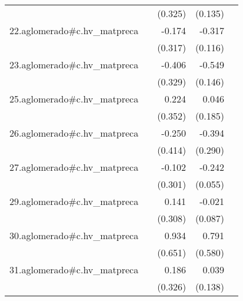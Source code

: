 {\begin{longtable}{l*{4}{D{.}{.}{-1}}}
            &                     &     (0.325)         &     (0.135)         &                     \\
\addlinespace
22.aglomerado#c.hv\_matpreca&                     &      -0.174         &      -0.317\sym{**} &                     \\
            &                     &     (0.317)         &     (0.116)         &                     \\
\addlinespace
23.aglomerado#c.hv\_matpreca&                     &      -0.406         &      -0.549\sym{***}&                     \\
            &                     &     (0.329)         &     (0.146)         &                     \\
\addlinespace
25.aglomerado#c.hv\_matpreca&                     &       0.224         &       0.046         &                     \\
            &                     &     (0.352)         &     (0.185)         &                     \\
\addlinespace
26.aglomerado#c.hv\_matpreca&                     &      -0.250         &      -0.394         &                     \\
            &                     &     (0.414)         &     (0.290)         &                     \\
\addlinespace
27.aglomerado#c.hv\_matpreca&                     &      -0.102         &      -0.242\sym{***}&                     \\
            &                     &     (0.301)         &     (0.055)         &                     \\
\addlinespace
29.aglomerado#c.hv\_matpreca&                     &       0.141         &      -0.021         &                     \\
            &                     &     (0.308)         &     (0.087)         &                     \\
\addlinespace
30.aglomerado#c.hv\_matpreca&                     &       0.934         &       0.791         &                     \\
            &                     &     (0.651)         &     (0.580)         &                     \\
\addlinespace
31.aglomerado#c.hv\_matpreca&                     &       0.186         &       0.039         &                     \\
            &                     &     (0.326)         &     (0.138)         &                     \\

\end{longtable}}
